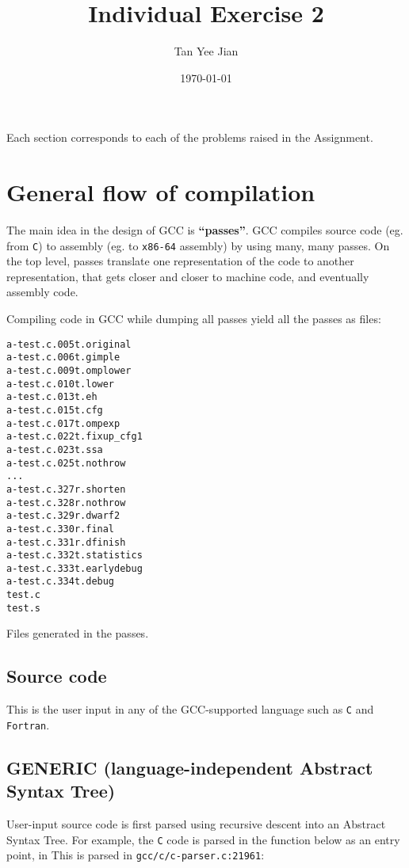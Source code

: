\documentclass[11pt]{article}
\author{Tan Yee Jian}
\date{\today}
\title{Individual Exercise 2}
\begin{document}
\maketitle
\tableofcontents

Each section corresponds to each of the problems raised in the Assignment.

\section{General flow of compilation}
\label{sec:org7e11e74}
The main idea in the design of GCC is \textbf{``passes''}\cite{passes}. GCC
compiles source code (eg. from \texttt{C}) to assembly (eg. to \texttt{x86-64}
assembly) by using many, many passes. On the top level, passes translate one
representation of the code to another representation, that gets closer and
closer to machine code, and eventually assembly code.

Compiling code in GCC while dumping all passes yield all the passes as files:
\begin{listing}[H]
\begin{verbatim}
a-test.c.005t.original
a-test.c.006t.gimple
a-test.c.009t.omplower
a-test.c.010t.lower
a-test.c.013t.eh
a-test.c.015t.cfg
a-test.c.017t.ompexp
a-test.c.022t.fixup_cfg1
a-test.c.023t.ssa
a-test.c.025t.nothrow
...
a-test.c.327r.shorten
a-test.c.328r.nothrow
a-test.c.329r.dwarf2
a-test.c.330r.final
a-test.c.331r.dfinish
a-test.c.332t.statistics
a-test.c.333t.earlydebug
a-test.c.334t.debug
test.c
test.s
\end{verbatim}
\caption{Files generated in the passes.}
\end{listing}

\subsection{Source code}
\label{sec:org43f51fe}

 This is the user input in any of the GCC-supported language such as \texttt{C} and
\texttt{Fortran}.

\subsection{GENERIC (language-independent Abstract Syntax Tree)}
\label{sec:org5658ca2}

User-input source code is first parsed using recursive descent into an
Abstract Syntax Tree. For example, the \texttt{C} code is parsed in the function
below as an entry point, in This is parsed in \texttt{gcc/c/c-parser.c:21961}:
\end{document}
